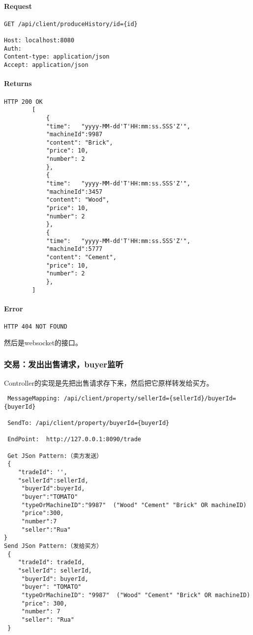 \documentclass{article}
\begin{document}
					\paragraph*{Request}
\begin{lstlisting}
GET /api/client/produceHistory/id={id}

Host: localhost:8080
Auth:
Content-type: application/json
Accept: application/json
\end{lstlisting}
					\paragraph*{Returns}
\begin{lstlisting}
HTTP 200 OK
        [
            {
            "time":   "yyyy-MM-dd'T'HH:mm:ss.SSS'Z'",
            "machineId":9987
            "content": "Brick",
            "price": 10,
            "number": 2
            },
            {
            "time":   "yyyy-MM-dd'T'HH:mm:ss.SSS'Z'",
            "machineId":3457
            "content": "Wood",
            "price": 10,
            "number": 2
            },
            {
            "time":   "yyyy-MM-dd'T'HH:mm:ss.SSS'Z'",
            "machineId":5777
            "content": "Cement",
            "price": 10,
            "number": 2
            },
        ]\end{lstlisting}
					\paragraph*{Error}
\begin{lstlisting}
HTTP 404 NOT FOUND
\end{lstlisting}

		然后是websocket的接口。

				\subsubsection{交易：发出出售请求，buyer监听}
                Controller的实现是先把出售请求存下来，然后把它原样转发给买方。

\begin{lstlisting}
 MessageMapping: /api/client/property/sellerId={sellerId}/buyerId={buyerId}

 SendTo: /api/client/property/buyerId={buyerId}

 EndPoint:  http://127.0.0.1:8090/trade

 Get JSon Pattern:（卖方发送）
 {
    "tradeId": '',
    "sellerId":sellerId,
     "buyerId":buyerId,
     "buyer":"TOMATO"
     "typeOrMachineID":"9987"  ("Wood" "Cement" "Brick" OR machineID)
     "price":300,
     "number":7
     "seller":"Rua"
}
Send JSon Pattern:（发给买方）
 {
    "tradeId": tradeId,
    "sellerId": sellerId,
     "buyerId": buyerId,
     "buyer": "TOMATO"
     "typeOrMachineID": "9987"  ("Wood" "Cement" "Brick" OR machineID)
     "price": 300,
     "number": 7
     "seller": "Rua"
 }

\end{lstlisting}
\end{document}
